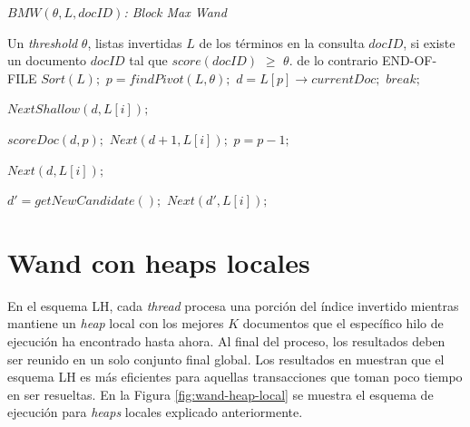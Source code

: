 \begin{algorithm}[!th]
\caption{\em $BMW(\theta, L, docID)$: Block Max Wand}
\label{alg:bmw}
\begin{algorithmic}[1]
\REQUIRE Un \textit{threshold} $\theta$, listas invertidas $L$ de los términos en la consulta
\ENSURE $docID$, si existe un documento $docID$ tal que $score(docID)$ $\geq$ $\theta$. de lo contrario END-OF-FILE
	\STATE $Sort(L);$
	\STATE $p = findPivot(L,\theta);$
	\STATE $d = L[p] \rightarrow currentDoc;$
  		\STATE $break;$
	\ENDIF
		
		\STATE $NextShallow(d, L[i]);$
	\ENDFOR
	
			\STATE $scoreDoc(d, p);$
				\STATE $Next(d + 1, L[i]);$
			\ENDFOR
		\ELSE
				\STATE $p = p - 1;$			
			\ENDWHILE
			
				\STATE $Next(d, L[i]);$
			\ENDFOR
			
		\ENDIF		
	\ELSE	
		\STATE $d' = getNewCandidate();$
			\STATE $Next(d', L[i]);$
		\ENDFOR
	\ENDIF
	
\ENDWHILE

\end{algorithmic}
\end{algorithm}

\section{Wand con heaps locales}
En el esquema LH, cada \textit{thread} procesa una porción del índice invertido mientras mantiene un \textit{heap} local con los mejores $K$ documentos que el específico hilo de ejecución ha encontrado hasta ahora. Al final del proceso, los resultados deben ser reunido en un solo conjunto final global. Los resultados en \citep{Rojas:2013} muestran que el esquema LH es más eficientes para aquellas transacciones que toman poco tiempo en ser resueltas. En la Figura \ref{fig:wand-heap-local} se muestra el esquema de ejecución para \textit{heaps} locales explicado anteriormente. 

